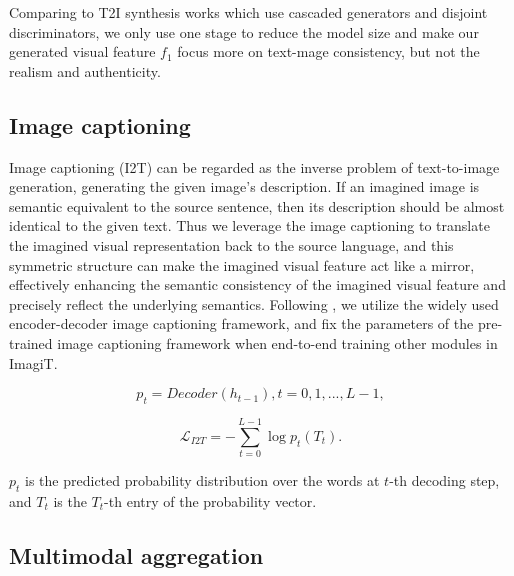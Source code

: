 \documentclass[11pt]{article}
\newcommand{\method}{ImagiT\xspace}
\begin{document}
Comparing to T2I synthesis works which use cascaded generators and disjoint discriminators\cite{zhang2017stackgan, xu2018attngan, qiao2019mirrorgan}, we only use one stage to reduce the model size and make our generated visual feature $f_{1}$ focus more on text-mage consistency, but not the realism and authenticity.

\subsection{Image captioning}

Image captioning (I2T) can be regarded as the inverse problem of text-to-image generation, generating the given image's description. If an imagined image is semantic equivalent to the source sentence, then its description should be almost identical to the given text. Thus we leverage the image captioning to translate the imagined visual representation back to the source language\cite{qiao2019mirrorgan}, and this symmetric structure can make the imagined visual feature act like a mirror, effectively enhancing the semantic consistency of the imagined visual feature and precisely reflect the underlying semantics. Following \citet{qiao2019mirrorgan}, we utilize the widely used encoder-decoder image captioning framework\cite{vinyals2015show}, and fix the parameters of the pre-trained image captioning framework when end-to-end training other modules in \method.

\begin{equation}
    p_{t}=Decoder(h_{t-1}),t=0,1,...,L-1,
\end{equation}

\begin{equation}
    \mathcal{L}_{I2T} = -\sum_{t=0}^{L-1} \log p_{t}(T_{t}).
    \label{equation10}
\end{equation}

$p_{t}$ is the predicted probability distribution over the words at $t$-th decoding step, and $T_{t}$ is the $T_{t}$-th entry of the probability vector.



















\subsection{Multimodal aggregation}
\end{document}
